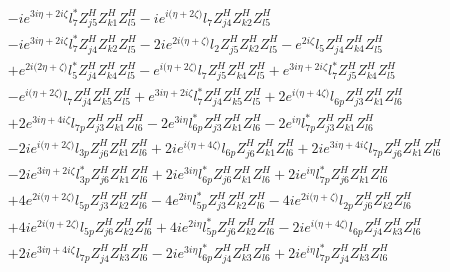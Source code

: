 \begin{align}
 &-i e^{3 i \eta +2 i \zeta } l_7^* Z_{{j 5}}^{H} Z_{{k 1}}^{H} Z_{{l 5}}^{H} -i e^{i \Big(\eta +2 \zeta \Big)} l_7 Z_{{j 4}}^{H} Z_{{k 2}}^{H} Z_{{l 5}}^{H} \nonumber \\ 
 &-i e^{3 i \eta +2 i \zeta } l_7^* Z_{{j 4}}^{H} Z_{{k 2}}^{H} Z_{{l 5}}^{H} -2 i e^{2 i \Big(\eta +\zeta \Big)} l_2 Z_{{j 5}}^{H} Z_{{k 2}}^{H} Z_{{l 5}}^{H} - e^{2 i \zeta } l_5 Z_{{j 4}}^{H} Z_{{k 4}}^{H} Z_{{l 5}}^{H} \nonumber \\ 
 &+e^{2 i \Big(2 \eta +\zeta \Big)} l_5^* Z_{{j 4}}^{H} Z_{{k 4}}^{H} Z_{{l 5}}^{H} - e^{i \Big(\eta +2 \zeta \Big)} l_7 Z_{{j 5}}^{H} Z_{{k 4}}^{H} Z_{{l 5}}^{H} +e^{3 i \eta +2 i \zeta } l_7^* Z_{{j 5}}^{H} Z_{{k 4}}^{H} Z_{{l 5}}^{H} \nonumber \\ 
 &- e^{i \Big(\eta +2 \zeta \Big)} l_7 Z_{{j 4}}^{H} Z_{{k 5}}^{H} Z_{{l 5}}^{H} +e^{3 i \eta +2 i \zeta } l_7^* Z_{{j 4}}^{H} Z_{{k 5}}^{H} Z_{{l 5}}^{H} +2 e^{i \Big(\eta +4 \zeta \Big)} l_{6p} Z_{{j 3}}^{H} Z_{{k 1}}^{H} Z_{{l 6}}^{H} \nonumber \\ 
 &+2 e^{3 i \eta +4 i \zeta } l_{7p} Z_{{j 3}}^{H} Z_{{k 1}}^{H} Z_{{l 6}}^{H} -2 e^{3 i \eta } l_{6p}^* Z_{{j 3}}^{H} Z_{{k 1}}^{H} Z_{{l 6}}^{H} -2 e^{i \eta } l_{7p}^* Z_{{j 3}}^{H} Z_{{k 1}}^{H} Z_{{l 6}}^{H} \nonumber \\ 
 &-2 i e^{i \Big(\eta +2 \zeta \Big)} l_{3p} Z_{{j 6}}^{H} Z_{{k 1}}^{H} Z_{{l 6}}^{H} +2 i e^{i \Big(\eta +4 \zeta \Big)} l_{6p} Z_{{j 6}}^{H} Z_{{k 1}}^{H} Z_{{l 6}}^{H} +2 i e^{3 i \eta +4 i \zeta } l_{7p} Z_{{j 6}}^{H} Z_{{k 1}}^{H} Z_{{l 6}}^{H} \nonumber \\ 
 &-2 i e^{3 i \eta +2 i \zeta } l_{3p}^* Z_{{j 6}}^{H} Z_{{k 1}}^{H} Z_{{l 6}}^{H} +2 i e^{3 i \eta } l_{6p}^* Z_{{j 6}}^{H} Z_{{k 1}}^{H} Z_{{l 6}}^{H} +2 i e^{i \eta } l_{7p}^* Z_{{j 6}}^{H} Z_{{k 1}}^{H} Z_{{l 6}}^{H} \nonumber \\ 
 &+4 e^{2 i \Big(\eta +2 \zeta \Big)} l_{5p} Z_{{j 3}}^{H} Z_{{k 2}}^{H} Z_{{l 6}}^{H} -4 e^{2 i \eta } l_{5p}^* Z_{{j 3}}^{H} Z_{{k 2}}^{H} Z_{{l 6}}^{H} -4 i e^{2 i \Big(\eta +\zeta \Big)} l_{2p} Z_{{j 6}}^{H} Z_{{k 2}}^{H} Z_{{l 6}}^{H} \nonumber \\ 
 &+4 i e^{2 i \Big(\eta +2 \zeta \Big)} l_{5p} Z_{{j 6}}^{H} Z_{{k 2}}^{H} Z_{{l 6}}^{H} +4 i e^{2 i \eta } l_{5p}^* Z_{{j 6}}^{H} Z_{{k 2}}^{H} Z_{{l 6}}^{H} -2 i e^{i \Big(\eta +4 \zeta \Big)} l_{6p} Z_{{j 4}}^{H} Z_{{k 3}}^{H} Z_{{l 6}}^{H} \nonumber \\ 
 &+2 i e^{3 i \eta +4 i \zeta } l_{7p} Z_{{j 4}}^{H} Z_{{k 3}}^{H} Z_{{l 6}}^{H} -2 i e^{3 i \eta } l_{6p}^* Z_{{j 4}}^{H} Z_{{k 3}}^{H} Z_{{l 6}}^{H} +2 i e^{i \eta } l_{7p}^* Z_{{j 4}}^{H} Z_{{k 3}}^{H} Z_{{l 6}}^{H} \nonumber \\ 

\end{align}
